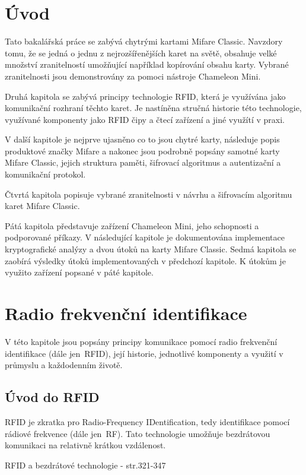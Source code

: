 \chapter{Úvod}
\label{uvod}
Tato bakalářská práce se zabývá chytrými kartami Mifare Classic. Navzdory tomu, že se jedná o jednu z nejrozšířenějších karet na světě, obsahuje velké množství zranitelností umožňující například kopírování obsahu karty. Vybrané zranitelnosti jsou demonstrovány za pomoci nástroje Chameleon Mini.\par
Druhá kapitola se zabývá principy technologie RFID, která je využívána jako komunikační rozhraní těchto karet. Je nastíněna stručná historie této technologie, využívané komponenty jako RFID čipy a čtecí zařízení a jiné využítí v praxi.\par
V další kapitole je nejprve ujasněno co to jsou chytré karty, následuje popis produktové značky Mifare a nakonec jsou podrobně popsány samotné karty Mifare Classic, jejich struktura paměti, šifrovací algoritmus a autentizační a komunikační protokol.\par
Čtvrtá kapitola popisuje vybrané zranitelnosti v návrhu a šifrovacím algoritmu karet Mifare Classic.\par
Pátá kapitola představuje zařízení Chameleon Mini, jeho schopnosti a podporované příkazy. 
V následující kapitole je dokumentována implementace kryptografické analýzy a dvou útoků na karty Mifare Classic.
Sedmá kapitola se zaobírá výsledky útoků implementovaných v předchozí kapitole. K útokům je využito zařízení popsané v páté kapitole.

\chapter{Radio frekvenční identifikace}
\label{technologie_rfid}
V této kapitole jsou popsány principy komunikace pomocí radio frekvenční identifikace (dále jen~RFID), její historie, jednotlivé komponenty a využití v průmyslu a každodenním životě.

\section{Úvod do RFID}
RFID je zkratka pro {Radio-Frequency IDentification}, tedy identifikace pomocí rádiové frekvence (dále jen~RF). Tato technologie umožňuje bezdrátovou komunikaci na relativně krátkou vzdálenost\cite{The_RF_in_RFID}.
\par
RFID a bezdrátové technologie \cite{Smart_Cards_Tokens_Security}{ - str.321-347}

